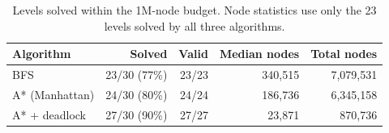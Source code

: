 \begin{table}[t]
\centering
\caption{Levels solved within the 1M-node budget. Node statistics use only the 23 levels solved by all three algorithms.}
\label{tab:solved}
\footnotesize
\begin{tabular}{lrrrr}
\toprule
Algorithm & Solved & Valid & Median nodes & Total nodes \\
\midrule
BFS & 23/30 (77\%) & 23/23 & 340{,}515 & 7{,}079{,}531 \\
A* (Manhattan) & 24/30 (80\%) & 24/24 & 186{,}736 & 6{,}345{,}158 \\
A* + deadlock & 27/30 (90\%) & 27/27 & 23{,}871 & 870{,}736 \\
\bottomrule
\end{tabular}
\end{table}
